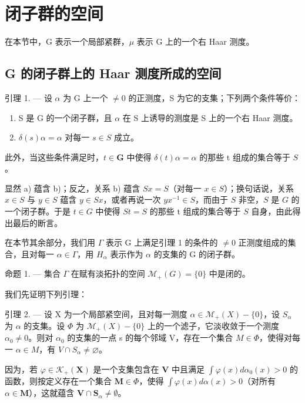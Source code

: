 \section{闭子群的空间}

在本节中，G 表示一个局部紧群，\(\mu\) 表示 G 上的一个右 Haar 测度。

\subsection{G 的闭子群上的 Haar 测度所成的空间}

引理 1. --- 设 \(\alpha\) 为 G 上一个 \(\neq 0\) 的正测度，S 为它的支集；下列两个条件等价：

\begin{enumerate}
\def\labelenumi{\alph{enumi})}
\item
  S 是 G 的一个闭子群，且 \(\alpha\) 在 S 上诱导的测度是 S 上的一个右 Haar 测度。
\item
  \(\delta(s)\alpha = \alpha\) 对每一 \(s \in S\) 成立。
\end{enumerate}

此外，当这些条件满足时，\(t \in \mathbf{G}\) 中使得 \(\delta(t)\alpha = \alpha\) 的那些 t 组成的集合等于 \(S\)。

显然 a) 蕴含 b)；反之，关系 b) 蕴含 \(Sx = S\)（对每一 \(x \in S\)）；换句话说，关系 \(x \in S\) 与 \(y \in S\) 蕴含 \(y \in Sx\)，或者再说一次 \(yx^{-1} \in S\)，而由于 \(S\) 非空，\(S\) 是 \(G\) 的一个闭子群。于是 \(t \in G\) 中使得 \(St = S\) 的那些 t 组成的集合等于 \(S\) 自身，由此得出最后的断言。

在本节其余部分，我们用 \(\Gamma\) 表示 G 上满足引理 1 的条件的 \(\neq0\) 正测度组成的集合，且对每一 \(\alpha\in\Gamma\)，用 \(H_{\alpha}\) 表示作为 \(\alpha\) 的支集的 G 的闭子群。

命题 1. --- 集合 \(\Gamma\) 在赋有淡拓扑的空间 \(\mathcal{M}_{+}(G) = \{0\}\) 中是闭的。

我们先证明下列引理：

引理 2. --- 设 X 为一个局部紧空间，且对每一测度 \(\alpha \in \mathcal{M}_{+}(X) - \{0\}\)，设 \(S_{\alpha}\) 为 \(\alpha\) 的支集。设 \(\Phi\) 为 \(\mathcal{M}_{+}(X) - \{0\}\) 上的一个滤子，它淡收敛于一个测度 \(\alpha_{0} \neq 0\)。则对 \(\alpha_{0}\) 的支集的一点 s 的每个邻域 V，存在一个集合 \(M \in \Phi\)，使得对每一 \(\alpha \in M\)，有 \(V \cap S_{\alpha} \neq \varnothing\)。

因为，若 \(\varphi \in \mathcal{K}_{+}(\mathbf{X})\) 是一个支集包含在 \(\mathbf{V}\) 中且满足 \(\int \varphi(x)d\alpha_0(x) > 0\) 的函数，则按定义存在一个集合 \(\mathbf{M} \in \Phi\)，使得 \(\int \varphi(x)d\alpha(x) > 0\)（对所有 \(\alpha \in \mathbf{M}\)），这就蕴含 \(\mathbf{V} \cap \mathbf{S}_{\alpha} \neq \emptyset\)。

